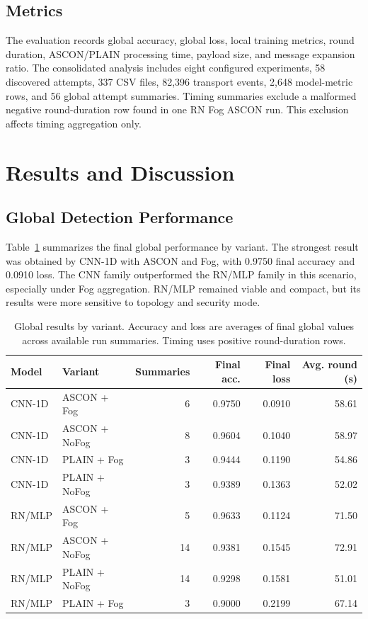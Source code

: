 \documentclass[runningheads]{llncs}
\begin{document}
\subsection{Metrics}

The evaluation records global accuracy, global loss, local training metrics, round duration, ASCON/PLAIN processing time, payload size, and message expansion ratio. The consolidated analysis includes eight configured experiments, 58 discovered attempts, 337 CSV files, 82,396 transport events, 2,648 model-metric rows, and 56 global attempt summaries. Timing summaries exclude a malformed negative round-duration row found in one RN Fog ASCON run. This exclusion affects timing aggregation only.

\section{Results and Discussion}

\subsection{Global Detection Performance}

Table~\ref{tab:global_results} summarizes the final global performance by variant. The strongest result was obtained by CNN-1D with ASCON and Fog, with 0.9750 final accuracy and 0.0910 loss. The CNN family outperformed the RN/MLP family in this scenario, especially under Fog aggregation. RN/MLP remained viable and compact, but its results were more sensitive to topology and security mode.

\begin{table}[t]
\centering
\caption{Global results by variant. Accuracy and loss are averages of final global values across available run summaries. Timing uses positive round-duration rows.}
\label{tab:global_results}
\begin{tabular}{llrrrr}
\toprule
Model & Variant & Summaries & Final acc. & Final loss & Avg. round (s) \\
\midrule
CNN-1D & ASCON + Fog & 6 & 0.9750 & 0.0910 & 58.61 \\
CNN-1D & ASCON + NoFog & 8 & 0.9604 & 0.1040 & 58.97 \\
CNN-1D & PLAIN + Fog & 3 & 0.9444 & 0.1190 & 54.86 \\
CNN-1D & PLAIN + NoFog & 3 & 0.9389 & 0.1363 & 52.02 \\
RN/MLP & ASCON + Fog & 5 & 0.9633 & 0.1124 & 71.50 \\
RN/MLP & ASCON + NoFog & 14 & 0.9381 & 0.1545 & 72.91 \\
RN/MLP & PLAIN + NoFog & 14 & 0.9298 & 0.1581 & 51.01 \\
RN/MLP & PLAIN + Fog & 3 & 0.9000 & 0.2199 & 67.14 \\
\bottomrule
\end{tabular}
\end{table}
\end{document}
